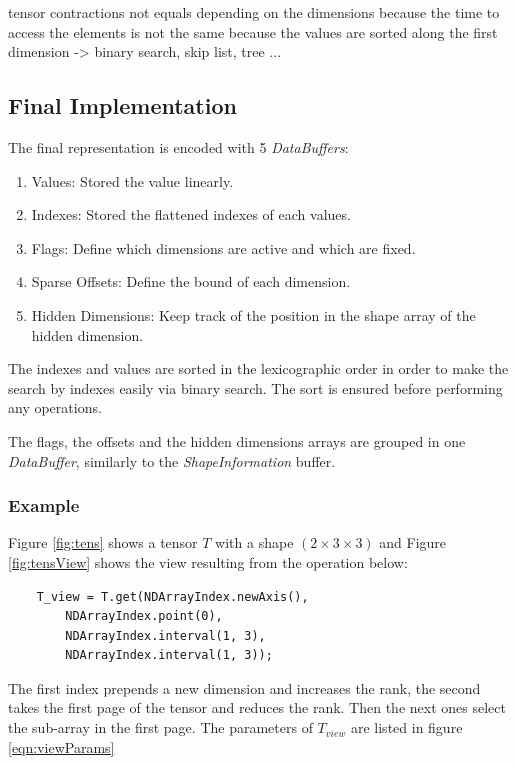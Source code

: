 tensor contractions not equals depending on the dimensions because the time to access the elements is not the same because the values are sorted along the first dimension
-> binary search, skip list, tree ...

\subsection{Final Implementation}
	
	The final representation is encoded with 5 \textit{DataBuffers}:
	\begin{enumerate}
		\item Values: Stored the value linearly.
		\item Indexes: Stored the flattened indexes of each values.
		\item Flags: Define which dimensions are active and which are fixed.
		\item Sparse Offsets: Define the bound of each dimension.
		\item Hidden Dimensions: Keep track of the position in the shape array of the hidden dimension.
	\end{enumerate}
	
		The indexes and values are sorted in the lexicographic order in order to make the search by indexes easily via binary search. The sort is ensured before performing any operations.
		
		The flags, the offsets and the hidden dimensions arrays are grouped in one \textit{DataBuffer}, similarly to the \textit{ShapeInformation} buffer.
		
\subsubsection{Example}
Figure \ref{fig:tens} shows a tensor $T$ with a shape $(2\times 3\times 3)$ and Figure \ref{fig:tensView} shows the view resulting from the operation below:

\begin{lstlisting}
	T_view = T.get(NDArrayIndex.newAxis(), 
		NDArrayIndex.point(0),
		NDArrayIndex.interval(1, 3), 
		NDArrayIndex.interval(1, 3));
\end{lstlisting}

The first index prepends a new dimension and increases the rank, the second takes the first page of the tensor and reduces the rank. Then the next ones select the sub-array in the first page. The parameters of $T_{view}$ are listed in figure \ref{eqn:viewParams} 

